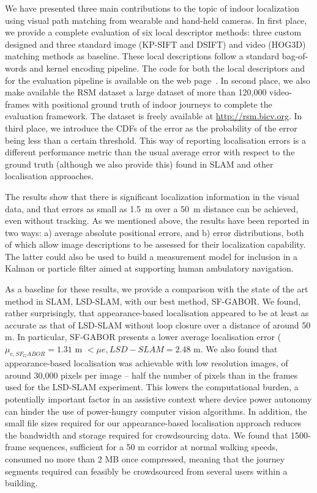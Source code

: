 We have presented three main contributions to the topic of indoor localization using visual path matching from wearable and hand-held cameras. In first place, we provide a complete evaluation of six local descriptor methods: three custom designed and three standard image (KP-SIFT and DSIFT) and video (HOG3D) matching methods as baseline. These local descriptions follow a standard bag-of-words and kernel encoding pipeline. The code for both the local descriptors and for the evaluation pipeline is available on the web page~\cite{Rivera-Rubio2014_LFVP_code}. In second place, we also make available the RSM dataset a large dataset of more than 120,000 video-frames with positional ground truth of indoor journeys to complete the evaluation framework. The dataset is freely available at \url{http://rsm.bicv.org}. In third place, we introduce the CDFs of the error as the probability of the error being less than a certain threshold. This way of reporting localisation errors is a different performance metric than the usual average error with respect to the ground truth (although we also provide this) found in SLAM and other localisation approaches.

The results show that there is significant localization information in the visual data, and that errors as small as \SI{1.5}{m} over a \SI{50}{m} distance can be achieved, even without tracking. As we mentioned above, the results have been reported in two ways: a) average absolute positional errors, and b) error distributions, both of which allow image descriptions to be assessed for their localization capability.  The latter could also be used to build a measurement model for inclusion in a Kalman or particle filter  aimed at supporting human ambulatory navigation. 

As a baseline for these results, we provide a comparison with the state of the art method in SLAM, LSD-SLAM, with our best method, SF-GABOR. We found, rather surprisingly, that appearance-based localisation appeared to be at least as accurate as that of LSD-SLAM without loop closure over a distance of around 50 m. In particular, SF-GABOR presents a lower average localisation error ($\mu_{e,SF_GABOR} = 1.31 $ m $< \mu{e,LSD-SLAM} = 2.48 $ m. We also found that appearance-based localisation was achievable with low resolution images, of around 30,000 pixels per image -- half the number of pixels than in the frames used for the LSD-SLAM experiment. This lowers the computational burden, a potentially important factor in an assistive context where device power autonomy can hinder the use of power-hungry computer vision algorithms. In addition, the small file sizes required for our appearance-based localisation approach reduces the bandwidth and storage required for crowdsourcing data. We found that 1500-frame sequences, sufficient for a 50 m corridor at normal walking speeds, consumed no more than 2 MB once compressed, meaning that the journey segments required can feasibly be crowdsourced from several users within a building.


